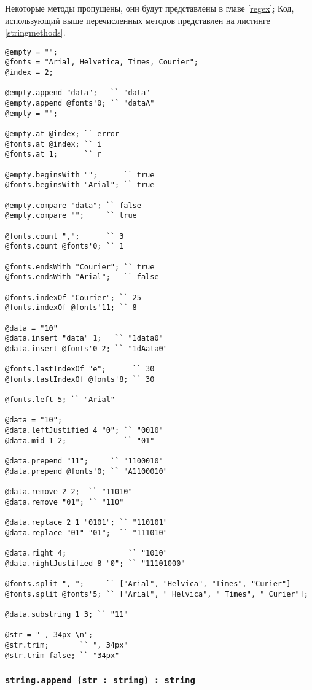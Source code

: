 Некоторые методы пропущены, они будут представлены в главе \ref{regex}; Код, использующий выше перечисленных методов представлен на листинге \ref{stringmethods}.

\begin{lstlisting}[caption=Методы класса string, label=stringmethods]
@empty = "";
@fonts = "Arial, Helvetica, Times, Courier";
@index = 2;

@empty.append "data";   `` "data"
@empty.append @fonts'0; `` "dataA"
@empty = "";

@empty.at @index; `` error
@fonts.at @index; `` i
@fonts.at 1;	  `` r

@empty.beginsWith "";      `` true
@fonts.beginsWith "Arial"; `` true

@empty.compare "data"; `` false
@empty.compare "";     `` true

@fonts.count ",";      `` 3
@fonts.count @fonts'0; `` 1

@fonts.endsWith "Courier"; `` true
@fonts.endsWith "Arial";   `` false

@fonts.indexOf "Courier"; `` 25
@fonts.indexOf @fonts'11; `` 8

@data = "10"
@data.insert "data" 1;   `` "1data0"
@data.insert @fonts'0 2; `` "1dAata0"

@fonts.lastIndexOf "e";      `` 30
@fonts.lastIndexOf @fonts'8; `` 30

@fonts.left 5; `` "Arial"

@data = "10";
@data.leftJustified 4 "0"; `` "0010"
@data.mid 1 2;             `` "01"

@data.prepend "11";     `` "1100010"
@data.prepend @fonts'0; `` "A1100010"

@data.remove 2 2;  `` "11010"
@data.remove "01"; `` "110"

@data.replace 2 1 "0101"; `` "110101"
@data.replace "01" "01";  `` "111010"

@data.right 4; 				`` "1010"
@data.rightJustified 8 "0"; `` "11101000"

@fonts.split ", ";     `` ["Arial", "Helvica", "Times", "Curier"]
@fonts.split @fonts'5; `` ["Arial", " Helvica", " Times", " Curier"];

@data.substring 1 3; `` "11"

@str = " , 34px \n";
@str.trim;       `` ", 34px"
@str.trim false; `` "34px"
\end{lstlisting}

\subsubsection{\lstinline|string.append (str : string) : string|}

